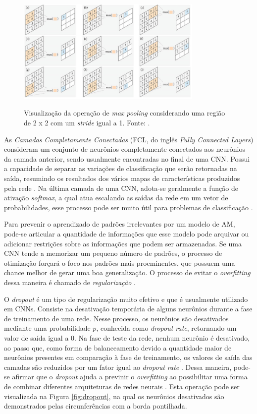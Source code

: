 \begin{figure}[h!]
  \centering
  \caption{Visualização da operação de \emph{max pooling} considerando uma região de 2 x 2 com um \emph{stride} igual a 1. Fonte: \cite{khan}.}
  \includegraphics[width=0.8\textwidth]{imgs/pooling}
  \label{fig:pooling}
\end{figure}


As \emph{Camadas Completamente Conectadas} (FCL, do inglês \emph{Fully Connected Layers}) consideram um conjunto de neurônios completamente conectados aos neurônios da camada anterior, sendo usualmente encontradas no final de uma CNN. Possui a capacidade de separar as variações de classificação que serão retornadas na saída, resumindo os resultados dos vários mapas de características produzidos pela rede \cite{khan}. Na última camada de uma CNN, adota-se geralmente a função de ativação \emph{softmax}, a qual atua escalando as saídas da rede em um vetor de probabilidades, esse processo pode ser muito útil para problemas de classificação \cite{gulli}.

Para prevenir o aprendizado de padrões irrelevantes por um modelo de AM, pode-se articular a quantidade de informações que esse modelo pode arquivar ou adicionar restrições sobre as informações que podem ser armazenadas. Se uma CNN tende a memorizar um pequeno número de padrões, o processo de otimização forçará o foco nos padrões mais proeminentes, que possuem uma chance melhor de gerar uma boa generalização. O processo de evitar o \emph{overfitting} dessa maneira é chamado de \emph{regularização} \cite{chollet}.

O \emph{dropout} é um tipo de regularização muito efetivo e que é usualmente utilizado em CNNs. Consiste na desativação temporária de alguns neurônios durante a fase de treinamento de uma rede. Nesse processo, os neurônios são desativados mediante uma probabilidade $p$, conhecida como \emph{dropout rate}, retornando um valor de saída igual a $0$. Na fase de teste da rede, nenhum neurônio é desativado, ao passo que, como forma de balanceamento devido a quantidade maior de neurônios presentes em comparação à fase de treinamento, os valores de saída das camadas são reduzidos por um fator igual ao \emph{dropout rate} \cite{chollet}. Dessa maneira, pode-se afirmar que o \emph{dropout} ajuda a previnir o \emph{overfitting} ao possibilitar uma forma de combinar diferentes arquiteturas de redes neurais \cite{buduma}. Esta operação pode ser visualizada na Figura \ref{fig:dropout}, na qual os neurônios desativados são demonstrados pelas circunferências com a borda pontilhada.

